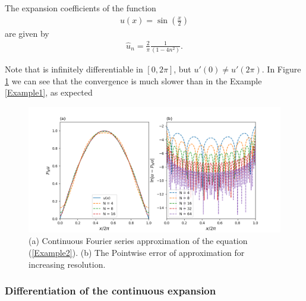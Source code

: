 	\begin{example}
	    The expansion coefficients of the function
    	\begin{align}
    		\label{Example2} 
    	    u(x) = \sin(\frac{x}{2})
    	\end{align}
    	are given by
    	\begin{align*}
    	     \hat{u}_{n} = \frac{2}{\pi} \frac{1}{(1 - 4n^2)}.
    	\end{align*}
    	
    	Note that is infinitely differentiable in $[0, 2 \pi]$, but $u'(0) \ne u' (2 \pi)$. In Figure \ref{fig2} we can see that the convergence is much slower than in the Example \ref{Example1}, as expected	
    	\begin{figure}[H]	
        \includegraphics[width=\textwidth]{Figures/example24.png}
        \caption{(a) Continuous Fourier series approximation of the equation (\ref{Example2}). (b) The Pointwise error of approximation for increasing resolution.}
        \label{fig2}
    	\end{figure}
	\end{example} 
	
	\subsubsection[subsection]{Differentiation of the continuous expansion}

